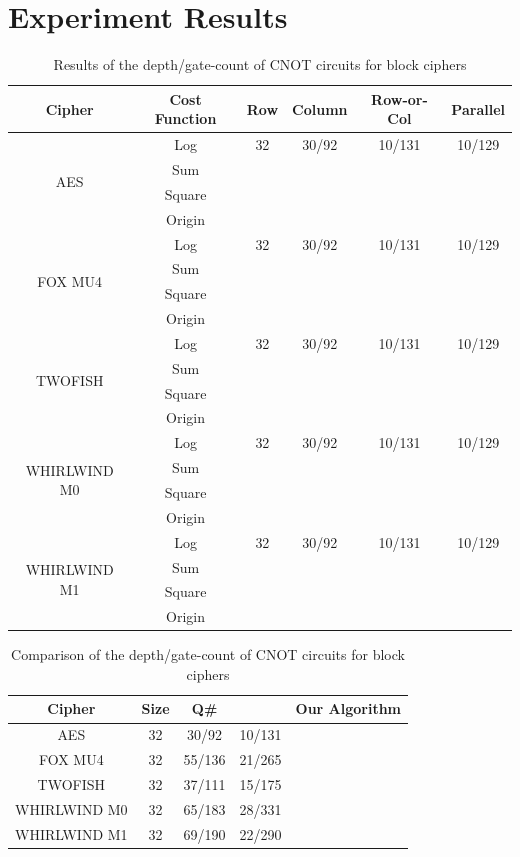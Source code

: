 \section{Experiment Results}

\begin{table}
    \centering
    \begin{tabular}{ c c c c c c } 
        \hline
        Cipher & Cost Function & Row & Column & Row-or-Col & Parallel \\
        \hline
        \multirow{4}{4em}{AES} & Log &  32 & 30/92 & 10/131 & 10/129 \\
         & Sum & & & & \\
         & Square & & & & \\
         & Origin & & & & \\
         \hline
         \multirow{4}{4em}{FOX MU4} & Log &  32 & 30/92 & 10/131 & 10/129 \\
         & Sum & & & & \\
         & Square & & & & \\
         & Origin & & & & \\
         \hline
         \multirow{4}{4em}{TWOFISH} & Log &  32 & 30/92 & 10/131 & 10/129 \\
         & Sum & & & & \\
         & Square & & & & \\
         & Origin & & & & \\
         \hline
         \multirow{4}{4em}{WHIRLWIND M0} & Log &  32 & 30/92 & 10/131 & 10/129 \\
         & Sum & & & & \\
         & Square & & & & \\
         & Origin & & & & \\
         \hline
         \multirow{4}{4em}{WHIRLWIND M1} & Log &  32 & 30/92 & 10/131 & 10/129 \\
         & Sum & & & & \\
         & Square & & & & \\
         & Origin & & & & \\
        \hline
    \end{tabular}
    \caption{Results of the depth/gate-count of CNOT circuits for block ciphers}
    \label{Greedy Algorithm Compare}
    \end{table}

\begin{table}
\centering
\begin{tabular}{ c c c c c } 
    \hline
    Cipher & Size & Q\# & \cite{cryptoeprint:2024/381} & Our Algorithm \\
    \hline
    AES & 32 & 30/92 & 10/131 &  \\ 
    FOX MU4 & 32 & 55/136 & 21/265 & \\
    TWOFISH & 32 & 37/111 & 15/175 & \\
    WHIRLWIND M0 & 32 & 65/183 & 28/331 & \\
    WHIRLWIND M1 & 32 & 69/190 & 22/290 & \\
    \hline
\end{tabular}
\caption{Comparison of the depth/gate-count of CNOT circuits for block ciphers}
\label{block-ciphers table}
\end{table}